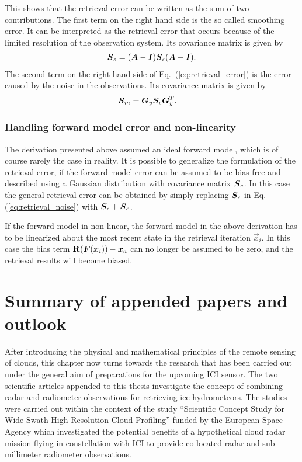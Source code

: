 This shows that the retrieval error can be written as the sum of two
contributions. The first term on the right hand side is the so called smoothing
error. It can be interpreted as the retrieval error that occurs because of the
limited resolution of the observation system. Its covariance matrix is given by
\begin{align}
  \boldsymbol{S}_s = (\boldsymbol{A} - \boldsymbol{I})\boldsymbol{S}_\epsilon(\boldsymbol{A} - \boldsymbol{I}).
\end{align}
The second term on the right-hand side of Eq.~(\ref{eq:retrieval_error}) is the error caused by the noise in the observations. Its covariance matrix is given by
\begin{align}\label{eq:retrieval_noise}
\boldsymbol{S}_m &= \boldsymbol{G}_y\boldsymbol{S}_\epsilon\boldsymbol{G}_y^T.
\end{align}

\subsection{Handling forward model error and non-linearity}

The derivation presented above assumed an ideal forward model, which is of
course rarely the case in reality. It is possible to generalize the formulation
of the retrieval error, if the forward model error can be assumed to be bias
free and described using a Gaussian distribution with covariance matrix
$\boldsymbol{S}_e$. In this case the general retrieval error can be obtained by simply
replacing $\boldsymbol{S}_\epsilon$ in Eq. (\ref{eq:retrieval_noise}) with
$\boldsymbol{S}_\epsilon + \boldsymbol{S}_e$.

If the forward model in non-linear, the forward model in the above derivation has to be
linearized about the most recent state in the retrieval iteration $\vec{x}_i$. In this
case the bias term $\mathbf{R}(\boldsymbol{F}(\boldsymbol{x}_i)) - \boldsymbol{x}_a$ can no longer be assumed
to be zero, and the retrieval results will become biased.

\chapter{Summary of appended papers and outlook}
\label{ch:appended_papers}

After introducing the physical and mathematical principles of the remote sensing
of clouds, this chapter now turns towards the research that has been carried out
under the general aim of preparations for the upcoming ICI sensor. The two
scientific articles appended to this thesis investigate the concept of combining
radar and radiometer observations for retrieving ice hydrometeors. The studies
were carried out within the context of the study ``Scientific Concept Study for
Wide-Swath High-Resolution Cloud Profiling'' funded by the European Space Agency
which investigated the potential benefits of a hypothetical cloud radar mission
flying in constellation with ICI to provide co-located radar and sub-millimeter
radiometer observations.

